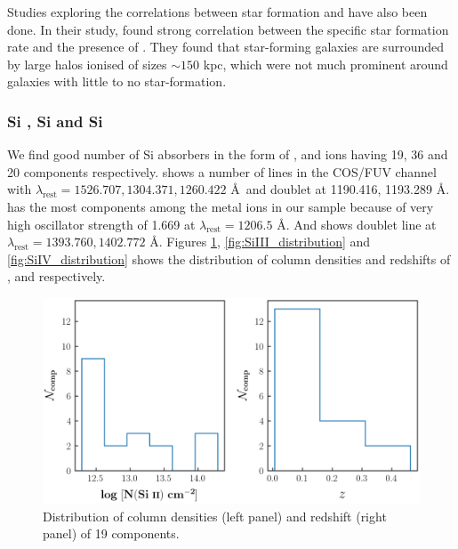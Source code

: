 Studies exploring the correlations between star formation and  have also been done. In their study, \citet{Tumlinson-2011,Tumlinson-2013} found strong correlation between the speciﬁc star formation rate and the presence of . They found that star-forming galaxies are surrounded by large halos ionised  of sizes $\sim 150$ kpc, which were not much prominent around galaxies with little to no star-formation.


\subsubsection*{Si \hspace*{-0.5mm}{\footnotesize II}, Si \hspace*{-0.5mm}{\footnotesize III} and Si \hspace*{-0.5mm}{\footnotesize IV}}

We find good number of Si absorbers in the form of ,  and  ions having 19, 36 and 20 components respectively.  shows a number of lines in the COS/FUV channel with $\lambda_\text{rest}=1526.707, 1304.371, 1260.422$ \AA \  and doublet at 1190.416, 1193.289 \AA.  has the most components among the metal ions in our sample because of very high oscillator strength of 1.669 at $\lambda_\text{rest}=1206.5$ \AA. And  shows doublet line at $\lambda_\text{rest}=1393.760,1402.772$ \AA. Figures \ref{fig:SiII_distribution}, \ref{fig:SiIII_distribution} and \ref{fig:SiIV_distribution} shows the distribution of column densities and redshifts of ,  and  respectively.


\begin{figure}
    \centering
    \includegraphics[width=\linewidth]{Figures/SiII_distribution_survey.png}
    \caption{Distribution of column densities (left panel) and redshift (right panel) of 19  components.}
    \label{fig:SiII_distribution}
\end{figure}

